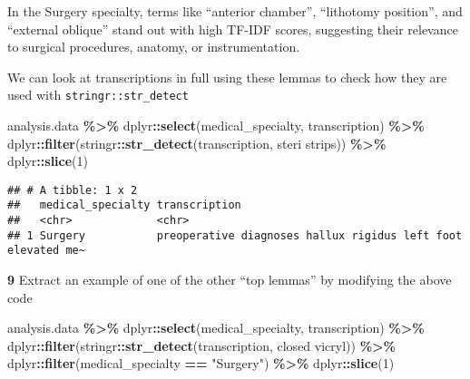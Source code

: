 \documentclass[
]{article}
\newenvironment{Shaded}{\begin{snugshade}}{\end{snugshade}}
\newcommand{\DecValTok}[1]{\textcolor[rgb]{0.00,0.00,0.81}{#1}}
\newcommand{\FunctionTok}[1]{\textcolor[rgb]{0.13,0.29,0.53}{\textbf{#1}}}
\newcommand{\NormalTok}[1]{#1}
\newcommand{\SpecialCharTok}[1]{\textcolor[rgb]{0.81,0.36,0.00}{\textbf{#1}}}
\newcommand{\StringTok}[1]{\textcolor[rgb]{0.31,0.60,0.02}{#1}}
\begin{document}
In the Surgery specialty, terms like ``anterior chamber'', ``lithotomy
position'', and ``external oblique'' stand out with high TF-IDF scores,
suggesting their relevance to surgical procedures, anatomy, or
instrumentation.

We can look at transcriptions in full using these lemmas to check how
they are used with \texttt{stringr::str\_detect}

\begin{Shaded}
\begin{Highlighting}[]
\NormalTok{analysis.data }\SpecialCharTok{\%\textgreater{}\%}\NormalTok{ dplyr}\SpecialCharTok{::}\FunctionTok{select}\NormalTok{(medical\_specialty, transcription) }\SpecialCharTok{\%\textgreater{}\%}\NormalTok{ dplyr}\SpecialCharTok{::}\FunctionTok{filter}\NormalTok{(stringr}\SpecialCharTok{::}\FunctionTok{str\_detect}\NormalTok{(transcription, }\StringTok{\textquotesingle{}steri strips\textquotesingle{}}\NormalTok{)) }\SpecialCharTok{\%\textgreater{}\%}\NormalTok{ dplyr}\SpecialCharTok{::}\FunctionTok{slice}\NormalTok{(}\DecValTok{1}\NormalTok{)}
\end{Highlighting}
\end{Shaded}

\begin{verbatim}
## # A tibble: 1 x 2
##   medical_specialty transcription                                               
##   <chr>             <chr>                                                       
## 1 Surgery           preoperative diagnoses hallux rigidus left foot elevated me~
\end{verbatim}

\textbf{9} Extract an example of one of the other ``top lemmas'' by
modifying the above code

\begin{Shaded}
\begin{Highlighting}[]
\NormalTok{analysis.data }\SpecialCharTok{\%\textgreater{}\%}
\NormalTok{  dplyr}\SpecialCharTok{::}\FunctionTok{select}\NormalTok{(medical\_specialty, transcription) }\SpecialCharTok{\%\textgreater{}\%}
\NormalTok{  dplyr}\SpecialCharTok{::}\FunctionTok{filter}\NormalTok{(stringr}\SpecialCharTok{::}\FunctionTok{str\_detect}\NormalTok{(transcription, }\StringTok{\textquotesingle{}closed vicryl\textquotesingle{}}\NormalTok{)) }\SpecialCharTok{\%\textgreater{}\%}
\NormalTok{  dplyr}\SpecialCharTok{::}\FunctionTok{filter}\NormalTok{(medical\_specialty }\SpecialCharTok{==} \StringTok{"Surgery"}\NormalTok{) }\SpecialCharTok{\%\textgreater{}\%}
\NormalTok{  dplyr}\SpecialCharTok{::}\FunctionTok{slice}\NormalTok{(}\DecValTok{1}\NormalTok{)}
\end{Highlighting}
\end{Shaded}
\end{document}
